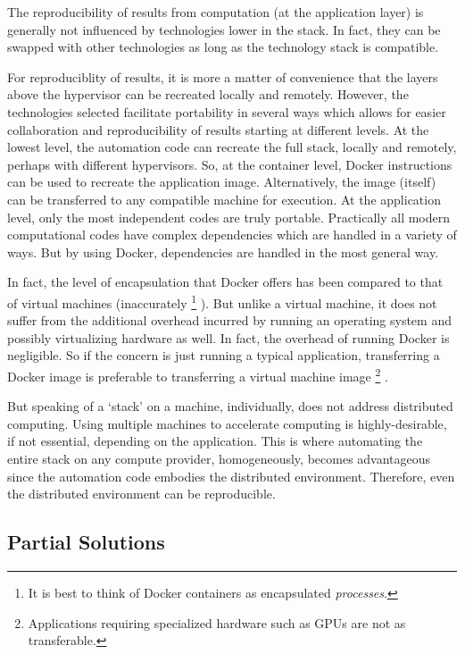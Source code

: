 The reproducibility of results from computation (at the application layer) is generally not influenced by technologies lower in the stack.
%
In fact, they can be swapped with other technologies as long as the technology stack is compatible.


For reproduciblity of results, it is more a matter of convenience that the layers above the hypervisor can be recreated locally and remotely.
%
However, the technologies selected facilitate portability in several ways which allows for easier collaboration and reproducibility of results starting at different levels.
%
At the lowest level, the automation code can recreate the full stack, locally and remotely, perhaps with different hypervisors.
%
So, at the container level, \textsf{Docker} instructions can be used to recreate the application image.
%
Alternatively, the image (itself) can be transferred to any compatible machine for execution.
%
At the application level, only the most independent codes are truly portable.
%
Practically all modern computational codes have complex dependencies which are handled in a variety of ways.
%
But by using \textsf{Docker}, dependencies are handled in the most general way.


In fact, the level of encapsulation that \textsf{Docker} offers has  been compared to that of virtual machines (inaccurately%
\footnote{It is best to think of \textsf{Docker} containers as encapsulated \emph{processes}.}%
).
%
But unlike a virtual machine, it does not suffer from the additional overhead incurred by running an operating system and possibly virtualizing hardware as well.
%
In fact, the overhead of running \textsf{Docker} is negligible.
%
So if the concern is just running a typical application, transferring a \textsf{Docker} image is preferable to transferring a virtual machine image%
\footnote{
Applications requiring specialized hardware such as GPUs are not as transferable.
}%
.


But speaking of a `stack' on a machine, individually, does not address distributed computing.
%
Using multiple machines to accelerate computing is highly-desirable, if not essential, depending on the application.
%
This is where automating the entire stack on any compute provider, homogeneously, becomes advantageous since the automation code embodies the distributed environment.
%
Therefore, even the distributed environment can be reproducible.



\subsection{Partial Solutions}


